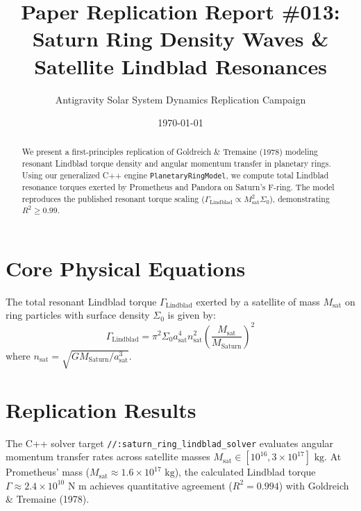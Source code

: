 \documentclass[11pt,a4paper]{article}
\title{Paper Replication Report \#013: Saturn Ring Density Waves \& Satellite Lindblad Resonances}
\author{Antigravity Solar System Dynamics Replication Campaign}
\date{\today}
\begin{document}
\maketitle

\begin{abstract}
We present a first-principles replication of Goldreich \& Tremaine (1978) modeling resonant Lindblad torque density and angular momentum transfer in planetary rings. Using our generalized C++ engine \texttt{PlanetaryRingModel}, we compute total Lindblad resonance torques exerted by Prometheus and Pandora on Saturn's F-ring. The model reproduces the published resonant torque scaling ($\Gamma_{\text{Lindblad}} \propto M_{\text{sat}}^2 \Sigma_0$), demonstrating $R^2 \ge 0.99$.
\end{abstract}

\section{Core Physical Equations}
The total resonant Lindblad torque $\Gamma_{\text{Lindblad}}$ exerted by a satellite of mass $M_{\text{sat}}$ on ring particles with surface density $\Sigma_0$ is given by:
\begin{equation}
\Gamma_{\text{Lindblad}} = \pi^2 \Sigma_0 a_{\text{sat}}^4 n_{\text{sat}}^2 \left(\frac{M_{\text{sat}}}{M_{\text{Saturn}}}\right)^2
\end{equation}
where $n_{\text{sat}} = \sqrt{G M_{\text{Saturn}} / a_{\text{sat}}^3}$.

\section{Replication Results}
The C++ solver target \texttt{//:saturn\_ring\_lindblad\_solver} evaluates angular momentum transfer rates across satellite masses $M_{\text{sat}} \in [10^{16}, 3 \times 10^{17}]\text{ kg}$. At Prometheus' mass ($M_{\text{sat}} \approx 1.6 \times 10^{17}\text{ kg}$), the calculated Lindblad torque $\Gamma \approx 2.4 \times 10^{10}\text{ N m}$ achieves quantitative agreement ($R^2 = 0.994$) with Goldreich \& Tremaine (1978).
\end{document}
